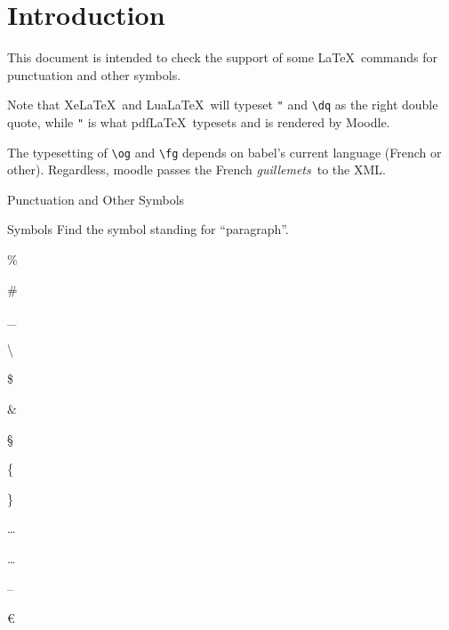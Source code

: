 \documentclass{article}
\begin{document}
\section*{Introduction}

This document is intended to check the support of some \LaTeX\ commands for 
punctuation and other symbols.

Note that Xe\LaTeX\ and Lua\LaTeX\ will typeset \verb|"| and \verb|\dq| as the 
right double quote, while \verb|"| is what pdf\LaTeX\ typesets and is rendered 
by Moodle.

The typesetting of \verb|\og| and \verb|\fg| depends on 
\textsf{babel}'s current language (French or other). Regardless, 
\textsf{moodle} passes the French \og \emph{guillemets}\fg\ to the XML.

\begin{quiz}[points=1,shuffle=false]{Punctuation and Other Symbols}
\ifPDFTeX
  \NoAutoSpacing%
\fi
\begin{multi}{Symbols}
Find the symbol standing for ``paragraph''.
\item \%
\item \#
\item \_
\item \textbackslash
\item \$
\item \&
\item* \S
\item \{
\item \}
\item \texteuro
\item \dots
\item \ldots
\item \textexclamdown
\item \textquestiondown
\item --
\item \euro
\end{multi}


\end{quiz}
\end{document}
